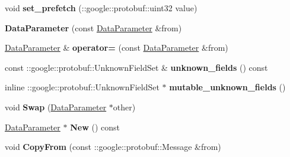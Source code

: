 \begin{DoxyCompactItemize}
\item 
\mbox{\label{classcaffe_1_1_data_parameter_a6b8ce9ae95d729c69d9fbdb92b59ffd1}} 
void {\bfseries set\+\_\+prefetch} (\+::google\+::protobuf\+::uint32 value)
\item 
\mbox{\label{classcaffe_1_1_data_parameter_a94a77bfe3167a401d7fe18120a29b22e}} 
{\bfseries Data\+Parameter} (const \mbox{\hyperlink{classcaffe_1_1_data_parameter}{Data\+Parameter}} \&from)
\item 
\mbox{\label{classcaffe_1_1_data_parameter_ae35ae71a30890c05d54df31114ce6dac}} 
\mbox{\hyperlink{classcaffe_1_1_data_parameter}{Data\+Parameter}} \& {\bfseries operator=} (const \mbox{\hyperlink{classcaffe_1_1_data_parameter}{Data\+Parameter}} \&from)
\item 
\mbox{\label{classcaffe_1_1_data_parameter_a0f8ec5baa77c46068d54660d2f438d53}} 
const \+::google\+::protobuf\+::\+Unknown\+Field\+Set \& {\bfseries unknown\+\_\+fields} () const
\item 
\mbox{\label{classcaffe_1_1_data_parameter_a558abee56269b3cb1459256ac41db74a}} 
inline \+::google\+::protobuf\+::\+Unknown\+Field\+Set $\ast$ {\bfseries mutable\+\_\+unknown\+\_\+fields} ()
\item 
\mbox{\label{classcaffe_1_1_data_parameter_a1aba7f6a57af76284341e0358e05b6b3}} 
void {\bfseries Swap} (\mbox{\hyperlink{classcaffe_1_1_data_parameter}{Data\+Parameter}} $\ast$other)
\item 
\mbox{\label{classcaffe_1_1_data_parameter_aae7703f60e8298596a5008471032aadd}} 
\mbox{\hyperlink{classcaffe_1_1_data_parameter}{Data\+Parameter}} $\ast$ {\bfseries New} () const
\item 
\mbox{\label{classcaffe_1_1_data_parameter_aae53dd492f5048afdcfe6a4743683627}} 
void {\bfseries Copy\+From} (const \+::google\+::protobuf\+::\+Message \&from)
\item 
\mbox{\label{classcaffe_1_1_data_parameter_a93f65d13391d7be7c518c0fe0043477d}} 

\end{DoxyCompactItemize}
